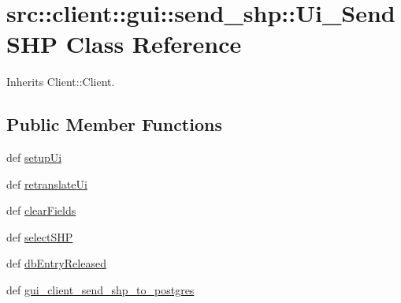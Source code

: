 \hypertarget{classsrc_1_1client_1_1gui_1_1send__shp_1_1Ui__SendSHP}{
\section{src::client::gui::send\_\-shp::Ui\_\-SendSHP Class Reference}
\label{classsrc_1_1client_1_1gui_1_1send__shp_1_1Ui__SendSHP}
}


Inherits Client::Client.

\subsection*{Public Member Functions}
\begin{DoxyCompactItemize}
\item 
def \hyperlink{classsrc_1_1client_1_1gui_1_1send__shp_1_1Ui__SendSHP_ac1cadbd0e0dd7104d2b5cb1efb5cd3a2}{setupUi}
\item 
def \hyperlink{classsrc_1_1client_1_1gui_1_1send__shp_1_1Ui__SendSHP_ab194c03c7a18b72a16915dea92d16617}{retranslateUi}
\item 
def \hyperlink{classsrc_1_1client_1_1gui_1_1send__shp_1_1Ui__SendSHP_a33f45a52ff4cb3d3bbf6613845da3938}{clearFields}
\item 
def \hyperlink{classsrc_1_1client_1_1gui_1_1send__shp_1_1Ui__SendSHP_a1086d51c284cbe57f91713c7aeb4bc0b}{selectSHP}
\item 
def \hyperlink{classsrc_1_1client_1_1gui_1_1send__shp_1_1Ui__SendSHP_a06e8aae7bd5c1d87a8a747d87e433187}{dbEntryReleased}
\item 
def \hyperlink{classsrc_1_1client_1_1gui_1_1send__shp_1_1Ui__SendSHP_a5bcad6d81d404ad4db08947c2711ad98}{gui\_\-client\_\-send\_\-shp\_\-to\_\-postgres}
\end{DoxyCompactItemize}
